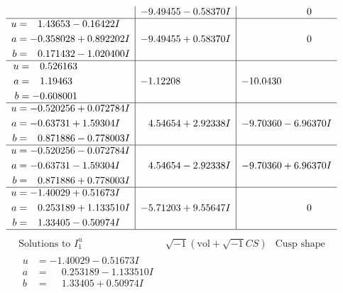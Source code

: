 \documentclass[1p]{elsarticle_modified}
\theoremstyle{definition}
\newcommand{\I}{\sqrt{-1}}
\begin{document}
$$\begin{array}{c|c|c}
 & -9.49455 - 0.58370 I & \phantom{-0.000000 } 0 \\ \hline\begin{aligned}
u &= \phantom{-}1.43653 - 0.16422 I \\
a &= -0.358028 + 0.892202 I \\
b &= \phantom{-}0.171432 - 1.020400 I\end{aligned}
 & -9.49455 + 0.58370 I & \phantom{-0.000000 } 0 \\ \hline\begin{aligned}
u &= \phantom{-}0.526163\phantom{ +0.000000I} \\
a &= \phantom{-}1.19463\phantom{ +0.000000I} \\
b &= -0.608001\phantom{ +0.000000I}\end{aligned}
 & -1.12208\phantom{ +0.000000I} & -10.0430\phantom{ +0.000000I} \\ \hline\begin{aligned}
u &= -0.520256 + 0.072784 I \\
a &= -0.63731 + 1.59304 I \\
b &= \phantom{-}0.871886 - 0.778003 I\end{aligned}
 & \phantom{-}4.54654 + 2.92338 I & -9.70360 - 6.96370 I \\ \hline\begin{aligned}
u &= -0.520256 - 0.072784 I \\
a &= -0.63731 - 1.59304 I \\
b &= \phantom{-}0.871886 + 0.778003 I\end{aligned}
 & \phantom{-}4.54654 - 2.92338 I & -9.70360 + 6.96370 I \\ \hline\begin{aligned}
u &= -1.40029 + 0.51673 I \\
a &= \phantom{-}0.253189 + 1.133510 I \\
b &= \phantom{-}1.33405 - 0.50974 I\end{aligned}
 & -5.71203 + 9.55647 I & \phantom{-0.000000 } 0\\
 \hline 
 \end{array}$$\newpage$$\begin{array}{c|c|c}  
\text{Solutions to }I^u_{1}& \I (\text{vol} + \sqrt{-1}CS) & \text{Cusp shape}\\
 \hline 
\begin{aligned}
u &= -1.40029 - 0.51673 I \\
a &= \phantom{-}0.253189 - 1.133510 I \\
b &= \phantom{-}1.33405 + 0.50974 I\end{aligned}

\end{array}$$
\end{document}
